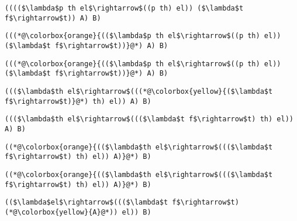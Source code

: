 \documentclass{beamer}
\begin{document}
\begin{frame}[fragile]{\CurrentSection}
\lstset{basicstyle=\ttfamily\small}\lstset{numbers=none}\lstset{language=ML}\begin{lstlisting}
(((($\lambda$p th el$\rightarrow$((p th) el)) ($\lambda$t f$\rightarrow$t)) A) B)
\end{lstlisting}
\pause\lstset{language=ML}\begin{lstlisting}
(((*@\colorbox{orange}{(($\lambda$p th el$\rightarrow$((p th) el)) ($\lambda$t f$\rightarrow$t))}@*) A) B)
\end{lstlisting}

\end{frame}

\begin{frame}[fragile]{\CurrentSection}
\lstset{basicstyle=\ttfamily\small}\lstset{numbers=none}\lstset{language=ML}\begin{lstlisting}
(((*@\colorbox{orange}{(($\lambda$p th el$\rightarrow$((p th) el)) ($\lambda$t f$\rightarrow$t))}@*) A) B)
\end{lstlisting}
\pause\lstset{language=ML}\begin{lstlisting}
((($\lambda$th el$\rightarrow$(((*@\colorbox{yellow}{($\lambda$t f$\rightarrow$t)}@*) th) el)) A) B)
\end{lstlisting}

\end{frame}

\begin{frame}[fragile]{\CurrentSection}
\lstset{basicstyle=\ttfamily\small}\lstset{numbers=none}\lstset{language=ML}\begin{lstlisting}
((($\lambda$th el$\rightarrow$((($\lambda$t f$\rightarrow$t) th) el)) A) B)
\end{lstlisting}
\pause\lstset{language=ML}\begin{lstlisting}
((*@\colorbox{orange}{(($\lambda$th el$\rightarrow$((($\lambda$t f$\rightarrow$t) th) el)) A)}@*) B)
\end{lstlisting}

\end{frame}

\begin{frame}[fragile]{\CurrentSection}
\lstset{basicstyle=\ttfamily\small}\lstset{numbers=none}\lstset{language=ML}\begin{lstlisting}
((*@\colorbox{orange}{(($\lambda$th el$\rightarrow$((($\lambda$t f$\rightarrow$t) th) el)) A)}@*) B)
\end{lstlisting}
\pause\lstset{language=ML}\begin{lstlisting}
(($\lambda$el$\rightarrow$((($\lambda$t f$\rightarrow$t) (*@\colorbox{yellow}{A}@*)) el)) B)
\end{lstlisting}

\end{frame}
\end{document}
